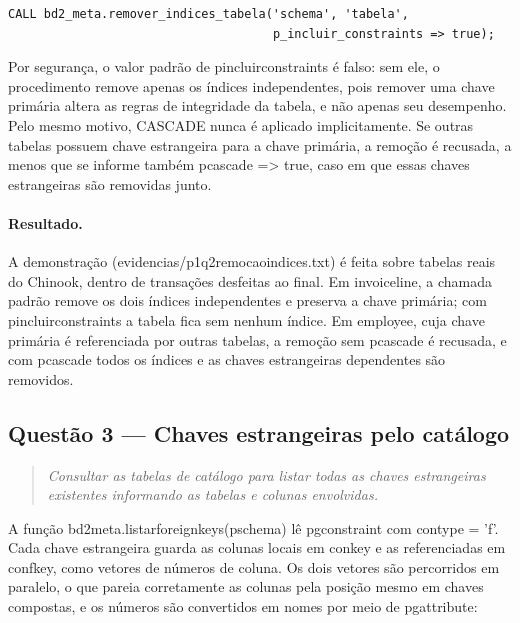 \documentclass[11pt,a4paper]{article}
\newcommand{\cod}[1]{{\ttfamily\renewcommand{\_}{\textunderscore\allowbreak}#1}}
\newenvironment{enunciado}{\begin{quote}\small\itshape}{\end{quote}}
\begin{document}
\begin{lstlisting}
CALL bd2_meta.remover_indices_tabela('schema', 'tabela',
                                     p_incluir_constraints => true);
\end{lstlisting}

Por segurança, o valor padrão de \cod{p\_incluir\_constraints} é falso: sem ele, o procedimento remove apenas os
índices independentes, pois remover uma chave primária altera as regras de integridade da tabela, e não apenas
seu desempenho. Pelo mesmo motivo, \cod{CASCADE} nunca é aplicado implicitamente. Se outras tabelas possuem chave
estrangeira para a chave primária, a remoção é recusada, a menos que se informe também \cod{p\_cascade => true},
caso em que essas chaves estrangeiras são removidas junto.

\paragraph{Resultado.} A demonstração (\cod{evidencias/p1\_q2\_remocao\_indices.txt}) é feita sobre tabelas reais
do Chinook, dentro de transações desfeitas ao final. Em \cod{invoice\_line}, a chamada padrão remove os dois índices
independentes e preserva a chave primária; com \cod{p\_incluir\_constraints} a tabela fica sem nenhum índice. Em
\cod{employee}, cuja chave primária é referenciada por outras tabelas, a remoção sem \cod{p\_cascade} é recusada, e
com \cod{p\_cascade} todos os índices e as chaves estrangeiras dependentes são removidos.

\subsection{Questão 3 --- Chaves estrangeiras pelo catálogo}

\begin{enunciado}
Consultar as tabelas de catálogo para listar todas as chaves estrangeiras existentes informando as tabelas e
colunas envolvidas.
\end{enunciado}

A função \cod{bd2\_meta.listar\_foreign\_keys(p\_schema)} lê \cod{pg\_constraint} com \cod{contype = 'f'}. Cada
chave estrangeira guarda as colunas locais em \cod{conkey} e as referenciadas em \cod{confkey}, como vetores de
números de coluna. Os dois vetores são percorridos em paralelo, o que pareia corretamente as colunas pela posição
mesmo em chaves compostas, e os números são convertidos em nomes por meio de \cod{pg\_attribute}:
\end{document}
